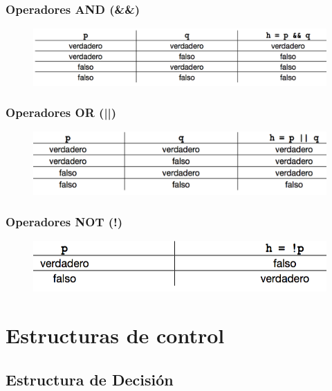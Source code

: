 \documentclass[handout]{beamer}
\begin{document}
\begin{frame}[t]\frametitle{Operadores AND (\&\&)}
    
\begin{figure}[tb]
  \centering
  \includegraphics[scale=.5]{./img/oplog1}
\end{figure}

\end{frame}

\begin{frame}[t]\frametitle{Operadores OR (||)}
    
\begin{figure}[tb]
  \centering
  \includegraphics[scale=.5]{./img/oplogOR}
\end{figure}

\end{frame}

\begin{frame}[t]\frametitle{Operadores NOT (!)}
    
\begin{figure}[tb]
  \centering
  \includegraphics[scale=.5]{./img/oplogNOT}
\end{figure}

\end{frame}

\section{Estructuras de control} %
\label{sec:estructuras_de_control}
\subsection{Estructura de Decisión} %
\label{sub:estructura_de_decision}
\end{document}
